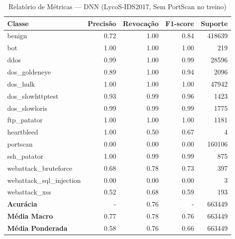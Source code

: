 \begin{table}[H]
    \centering
    \small
    \begin{tabular}{lrrrr}
        \hline
        Classe                    & Precisão & Revocação & F1-score & Suporte \\
        \hline
        benign                    & 0.72     & 1.00      & 0.84     & 418639  \\
        bot                       & 1.00     & 1.00      & 1.00     & 219     \\
        ddos                      & 0.99     & 1.00      & 0.99     & 28596   \\
        dos\_goldeneye            & 0.89     & 1.00      & 0.94     & 2096    \\
        dos\_hulk                 & 1.00     & 1.00      & 1.00     & 47942   \\
        dos\_slowhttptest         & 0.93     & 0.99      & 0.96     & 1423    \\
        dos\_slowloris            & 0.99     & 0.99      & 0.99     & 1775    \\
        ftp\_patator              & 1.00     & 1.00      & 1.00     & 1181    \\
        heartbleed                & 1.00     & 0.50      & 0.67     & 4       \\
        portscan                  & 0.00     & 0.00      & 0.00     & 160106  \\
        ssh\_patator              & 1.00     & 0.99      & 0.99     & 875     \\
        webattack\_bruteforce     & 0.68     & 0.78      & 0.73     & 397     \\
        webattack\_sql\_injection & 0.00     & 0.00      & 0.00     & 3       \\
        webattack\_xss            & 0.52     & 0.68      & 0.59     & 193     \\
        \hline
        \textbf{Acurácia}         & -        & 0.76      & -        & 663449  \\
        \textbf{Média Macro}      & 0.77     & 0.78      & 0.76     & 663449  \\
        \textbf{Média Ponderada}  & 0.58     & 0.76      & 0.66     & 663449  \\
        \hline
    \end{tabular}
    \caption{Relatório de Métricas — DNN (LycoS-IDS2017, Sem PortScan no treino)}
    \label{table:dnn_lycos_sem_portscan_metricas}
\end{table}
